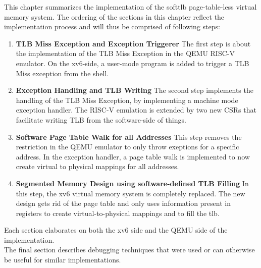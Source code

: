 This chapter summarizes the implementation of the softtlb page-table-less virtual memory system.
The ordering of the sections in this chapter reflect the implementation process and will thus
be comprised of following steps:
\begin{enumerate}
    \item \textbf{TLB Miss Exception and Exception Triggerer} The first step is about
          the implementation of the TLB Miss Exception in the QEMU RISC-V emulator. On the xv6-side,
          a user-mode program is added to trigger a TLB Miss exception from the shell.
    \item \textbf{Exception Handling and TLB Writing} The second step implements the
          handling of the TLB Miss Exception, by implementing a machine mode exception handler.
          The RISC-V emulation is extended by two new CSRs that facilitate writing TLB from the
          software-side of things.
    \item \textbf{Software Page Table Walk for all Addresses} This step removes the restriction
          in the QEMU emulator to only throw exeptions for a specific address. In the exception handler,
          a page table walk is implemented to now create virtual to physical mappings for all addresses.
    \item \textbf{Segmented Memory Design using software-defined TLB Filling} In this step, the xv6 virtual memory system is completely
          replaced. The new design gets rid of the page table and only uses information present in
          registers to create virtual-to-physical mappings and to fill the tlb.\\
\end{enumerate}
Each section elaborates on both the xv6 side and the QEMU side of the implementation.\\
The final section describes debugging techniques that were used or can otherwise be useful for
similar implementations.

